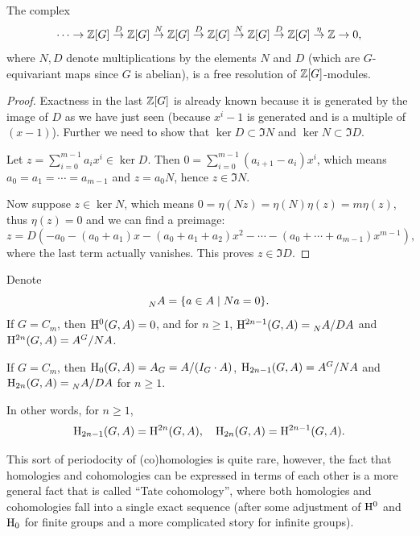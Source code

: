 \begin{thm}
    The complex
    \[\cdots\to \mathbb{Z}[G]\overset{D}{\to} \mathbb{Z}[G]\overset{N}{\to}\mathbb{Z}[G]\overset{D}{\to}\mathbb{Z}[G]\overset{N}{\to}\mathbb{Z}[G]\overset{D}{\to}\mathbb{Z}[G]\overset{\eta}{\to}\mathbb{Z}\to 0,\]
    where $N,D$ denote multiplications by the elements $N$ and $D$ (which are $G$-equivariant maps since $G$ is abelian), is a free resolution of $\mathbb{Z}[G]$-modules.
\end{thm}
\begin{proof}
    Exactness in the last $\mathbb{Z}[G]$ is already known because it is generated by the image of $D$ as we have just seen (because $x^i-1$ is generated and is a multiple of $(x-1)$). Further we need to show that $\ker D\subset \Im N$ and $\ker N\subset \Im D$. 

    Let $z=\sum_{i=0}^{m-1}a_ix^i\in\ker D$. Then $0=\sum_{i=0}^{m-1}(a_{i+1}-a_i)x^i$, which means $a_0=a_1=\cdots=a_{m-1}$ and $z=a_0 N$, hence $z\in \Im N$.

    Now suppose $z\in \ker N$, which means $0=\eta(Nz)=\eta(N)\eta(z)=m\eta(z)$, thus $\eta(z)=0$ and we can find a preimage:
    \[z=D(-a_0-(a_0+a_1)x-(a_0+a_1+a_2)x^2-\cdots -(a_0+\cdots +a_{m-1})x^{m-1}),\]
    where the last term actually vanishes. This proves $z\in \Im D$.
\end{proof}
\begin{cor}
    Denote
    \[\prescript{}{N}{A}=\{a\in A\mid Na=0\}.\]
    If $G=C_m$, then $\mathrm{H}^0(G,A)=0$, and for $n\geq 1$, $\mathrm{H}^{2n-1}(G,A)=\prescript{}{N}{A}\slash DA$ and $\mathrm{H}^{2n}(G,A)=A^G\slash NA$.
\end{cor}
\begin{cor}
    If $G=C_m$, then $\mathrm{H}_0(G,A)=A_G=A\slash (I_G\cdot A)$, $\mathrm{H}_{2n-1}(G,A)=A^G\slash NA$ and $\mathrm{H}_{2n}(G,A)=\prescript{}{N}{A}\slash DA$ for $n\geq 1$.

    In other words, for $n\geq 1$,
    \[\mathrm{H}_{2n-1}(G,A)=\mathrm{H}^{2n}(G,A),\quad \mathrm{H}_{2n}(G,A)=\mathrm{H}^{2n-1}(G,A).\]
\end{cor}
\begin{rem}
    This sort of periodocity of (co)homologies is quite rare, however, the fact that homologies and cohomologies can be expressed in terms of each other is a more general fact that is called ``Tate cohomology'', where both homologies and cohomologies fall into a single exact sequence (after some adjustment of $\mathrm{H}^0$ and $\mathrm{H}_0$ for finite groups and a more complicated story for infinite groups). 
\end{rem}




